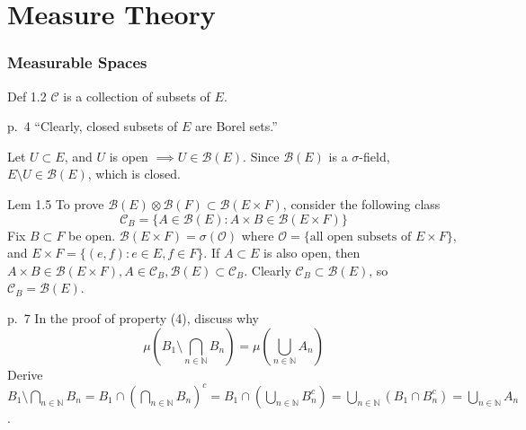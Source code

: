 \part{Measure Theory}
\setcounter{section}{0}
\section{Measurable Spaces}
\begin{note}{Def 1.2}
    $\mathcal{C}$ is a collection of subsets of $E$.
\end{note}

\begin{note}{p.~4}
    ``Clearly, closed subsets of $E$ are Borel sets.'' 
    
    Let $U\subset E$, and $U$ is open $\implies U\in\mathcal{B}(E)$. Since $\mathcal{B}(E)$ is a $\sigma$-field, $E\setminus U\in \mathcal{B}(E)$, which is closed.
\end{note}

\begin{note}{Lem 1.5}
    To prove $\mathcal{B}(E)\otimes \mathcal{B}(F)\subset \mathcal{B}(E\times F)$, consider the following class
    \[\mathcal{C}_B=\{A\in \mathcal{B}(E):A\times B\in \mathcal{B}(E\times F)\}\]
    Fix $B\subset F$ be open. $\mathcal{B}(E\times F)=\sigma(\mathcal{O})$ where $\mathcal{O}=\{\text{all open subsets of }E\times F\}$, and $E\times F=\{(e,f): e\in E,f\in F\}$. If $A\subset E$ is also open, then $A\times B\in \mathcal{B}(E\times F),A\in \mathcal{C}_B,\mathcal{B}(E)\subset \mathcal{C}_B$. Clearly $\mathcal{C}_B\subset \mathcal{B}(E)$, so $\mathcal{C}_B=\mathcal{B}(E)$.
\end{note}

\begin{note}{p.~7}
    In the proof of property (4), discuss why
    \[
    \mu\left(
    B_1\setminus \bigcap_{n\in \mathbb{N}}B_n
    \right)=\mu\left(
    \bigcup_{n\in \mathbb{N}}A_n
    \right)
    \]
    Derive $B_1\setminus \bigcap_{n\in \mathbb{N}}B_n=B_1\cap(\bigcap_{n\in \mathbb{N}}B_n)^c=B_1\cap(\bigcup_{n\in \mathbb{N}}B_n^c)=\bigcup_{n\in \mathbb{N}}(B_1\cap B_n^c)=\bigcup_{n\in \mathbb{N}}A_n$.
\end{note}

